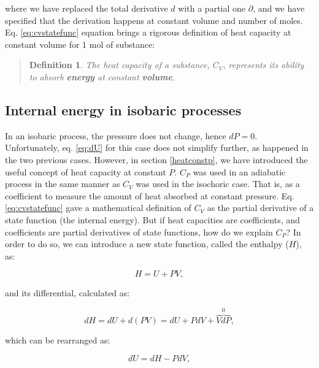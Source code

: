 \documentclass[
  9pt,
]{extbook}
\theoremstyle{definition}
\newtheorem{definition}{Definition}[chapter]
\theoremstyle{definition}
\theoremstyle{definition}
\theoremstyle{definition}
\theoremstyle{remark}
\begin{document}
where we have replaced the total derivative \(d\) with a partial one \(\partial\), and we have specified that the derivation happens at constant volume and number of moles. Eq. \eqref{eq:cvstatefunc} equation brings a rigorous definition of heat capacity at constant volume for 1 mol of substance:

\begin{quote}
\begin{definition}
\protect\hypertarget{def:newdefcv}{}\label{def:newdefcv}\emph{The heat capacity of a substance, \(C_V\), represents its ability to absorb \textbf{energy} at constant \textbf{volume}.}
\end{definition}
\end{quote}

\subsection{Internal energy in isobaric processes}\label{enthalpy}

In an isobaric process, the pressure does not change, hence \(dP=0\). Unfortunately, eq. \eqref{eq:dU} for this case does not simplify further, as happened in the two previous cases. However, in section \ref{heatconstp}, we have introduced the useful concept of heat capacity at constant \(P\). \(C_P\) was used in an adiabatic process in the same manner as \(C_V\) was used in the isochoric case. That is, as a coefficient to measure the amount of heat absorbed at constant pressure. Eq. \eqref{eq:cvstatefunc} gave a mathematical definition of \(C_V\) as the partial derivative of a state function (the internal energy). But if heat capacities are coefficients, and coefficients are partial derivatives of state functions, how do we explain \(C_P\)? In order to do so, we can introduce a new state function, called the enthalpy (\(H\)), as:

\begin{equation}
  H = U + PV,
  \label{eq:enthalpydef}
\end{equation}

and its differential, calculated as:

\begin{equation}
  dH = dU + d(PV) = dU + PdV + \overbrace{VdP}^{0},
  \label{eq:enthalpydefdiff}
\end{equation}

which can be rearranged as:

\begin{equation}
  dU = dH -PdV,
  \label{eq:enthalpydefdiffu}
\end{equation}
\end{document}
